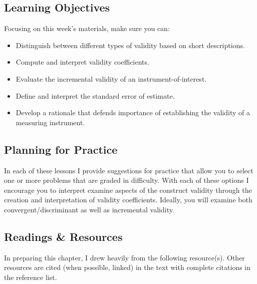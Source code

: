 \documentclass[
  english,
]{book}
\providecommand{\tightlist}{%
  \setlength{\itemsep}{0pt}\setlength{\parskip}{0pt}}
\begin{document}
\hypertarget{learning-objectives-2}{%
\subsection{Learning Objectives}\label{learning-objectives-2}}

Focusing on this week's materials, make sure you can:

\begin{itemize}
\tightlist
\item
  Distinguish between different types of validity based on short descriptions.
\item
  Compute and interpret validity coefficients.
\item
  Evaluate the incremental validity of an instrument-of-interest.
\item
  Define and interpret the standard error of estimate.
\item
  Develop a rationale that defends importance of establishing the validity of a measuring instrument.
\end{itemize}

\hypertarget{planning-for-practice-2}{%
\subsection{Planning for Practice}\label{planning-for-practice-2}}

In each of these lessons I provide suggestions for practice that allow you to select one or more problems that are graded in difficulty. With each of these options I encourage you to interpret examine aspects of the construct validity through the creation and interpretation of validity coefficients. Ideally, you will examine both convergent/discriminant as well as incremental validity.

\hypertarget{readings-resources-2}{%
\subsection{Readings \& Resources}\label{readings-resources-2}}

In preparing this chapter, I drew heavily from the following resource(s). Other resources are cited (when possible, linked) in the text with complete citations in the reference list.
\end{document}
